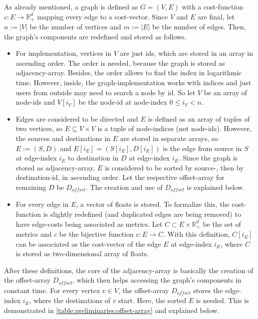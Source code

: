     As already mentioned, a graph is defined as $G = (V, E)$ with a cost-function $c: E \to \mathbb{R}_+^d$ mapping every edge to a cost-vector.
    Since $V$ and $E$ are final, let $n := \left| V \right|$ be the number of vertices and $m := \left| E \right|$ be the number of edges.
    Then, the graph's components are redefined and stored as follows.
    \begin{itemize}
        \item[Vertices:]
            For implementation, vertices in $V$ are just ids, which are stored in an array in ascending order.
            The order is needed, because the graph is stored as adjacency-array.
            Besides, the order allows to find the index in logarithmic time.
            However, inside, the graph-implementation works with indices and just users from outside may need to search a node by id.
            So let $V$ be an array of node-ids and $V[i_V]$ be the node-id at node-index $0 \le i_V < n$.
        \item[Edges:]
            Edges are considered to be directed and $E$ is defined as an array of tuples of two vertices, so $E \subseteq V \times V$ is a tuple of node-indices (not node-ids).
            However, the sources and destinations in $E$ are stored in separate arrays, so $E := (S, D)$ and $E[i_E] = (S[i_E], D[i_E])$ is the edge from source in $S$ at edge-index $i_E$ to destination in $D$ at edge-index $i_E$.
            Since the graph is stored as adjacency-array, $E$ is considered to be sorted by source-, then by destination-id, in ascending order.
            Let the respective offset-array for remaining $D$ be $D_{\mathit{offset}}$.
            The creation and use of $D_{\mathit{offset}}$ is explained below.
        \item[\Glspl{metric}:]
            For every edge in $E$, a vector of floats is stored.
            To formalize this, the cost-function is slightly redefined (and duplicated edges are being removed) to have edge-costs being associated as \glspl{metric}.
            Let $C \subset E \times \mathbb{R}_+^d$ be the set of \glspl{metric} and $c$ be the bijective function $c: E \to C$.
            With this definition, $C[i_E]$ can be associated as the cost-vector of the edge $E$ at edge-index $i_E$, where $C$ is stored as two-dimensional array of floats.
    \end{itemize}

    After these definitions, the core of the adjacency-array is basically the creation of the offset-array $D_{\mathit{offset}}$, which then helps accessing the graph's components in constant time.
    For every vertex $v \in V$, the offset-array $D_{\mathit{offset}}$ stores the edge-index $i_E$, where the destinations of $v$ start.
    Here, the sorted $E$ is needed.
    This is demonstrated in \cref{table:preliminaries:offset-array} and explained below.

